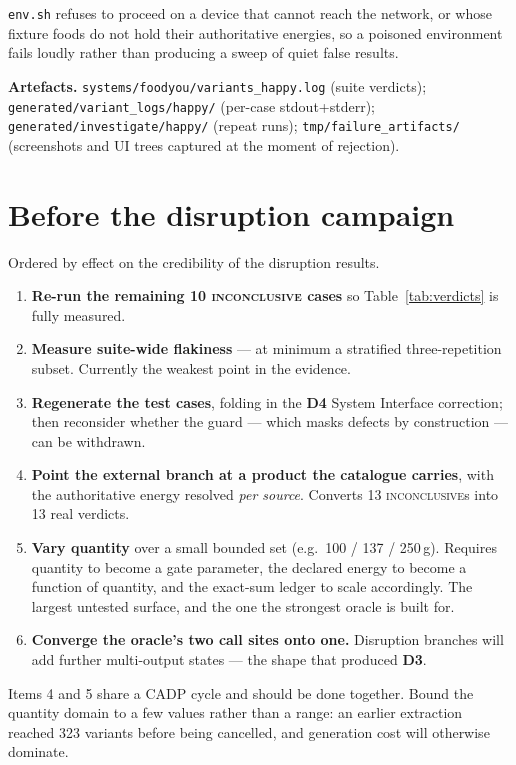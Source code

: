\documentclass[11pt,a4paper]{article}
\newcommand{\dref}[1]{\textbf{D#1}}
\begin{document}
\noindent\texttt{env.sh} refuses to proceed on a device that cannot reach the
network, or whose fixture foods do not hold their authoritative energies, so a
poisoned environment fails loudly rather than producing a sweep of quiet false
results.

\medskip
\noindent\textbf{Artefacts.}
\texttt{systems/foodyou/variants\_happy.log} (suite verdicts);
\texttt{generated/variant\_logs/happy/} (per-case stdout+stderr);
\texttt{generated/investigate/happy/} (repeat runs);
\texttt{tmp/failure\_artifacts/} (screenshots and UI trees captured at the moment of
rejection).

\section{Before the disruption campaign}

Ordered by effect on the credibility of the disruption results.

\begin{enumerate}\setlength\itemsep{2pt}
  \item \textbf{Re-run the remaining 10 \textsc{inconclusive} cases} so
  Table~\ref{tab:verdicts} is fully measured.
  \item \textbf{Measure suite-wide flakiness} --- at minimum a stratified
  three-repetition subset. Currently the weakest point in the evidence.
  \item \textbf{Regenerate the test cases}, folding in the \dref{4} System
  Interface correction; then reconsider whether the guard --- which masks defects
  by construction --- can be withdrawn.
  \item \textbf{Point the external branch at a product the catalogue carries}, with
  the authoritative energy resolved \emph{per source}. Converts 13
  \textsc{inconclusive}s into 13 real verdicts.
  \item \textbf{Vary quantity} over a small bounded set (e.g.\ 100 / 137 / 250\,g).
  Requires quantity to become a gate parameter, the declared energy to become a
  function of quantity, and the exact-sum ledger to scale accordingly. The largest
  untested surface, and the one the strongest oracle is built for.
  \item \textbf{Converge the oracle's two call sites onto one.} Disruption branches
  will add further multi-output states --- the shape that produced \dref{3}.
\end{enumerate}

\noindent Items 4 and 5 share a CADP cycle and should be done together. Bound the
quantity domain to a few values rather than a range: an earlier extraction reached
323 variants before being cancelled, and generation cost will otherwise dominate.
\end{document}
